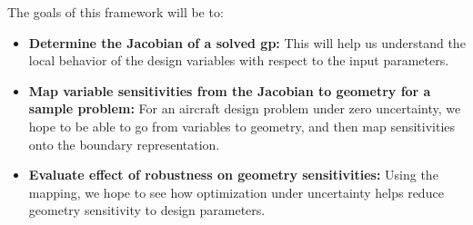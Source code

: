 \documentclass[journal]{new-aiaa}
\begin{document}
The goals of this framework will be to:
\begin{itemize}
    \item \textbf{Determine the Jacobian of a solved \gls{gp}:}
                This will help us understand the local behavior
                of the design variables with respect to the input parameters.
    \item \textbf{Map variable sensitivities from the Jacobian to geometry for a sample problem:}
                For an aircraft design problem under zero uncertainty, we hope to be able to
                go from variables to geometry, and then map sensitivities onto the boundary representation.
    \item \textbf{Evaluate effect of robustness on geometry sensitivities:}
                Using the mapping, we hope to see how optimization under uncertainty
                helps reduce geometry sensitivity to design parameters. 
\end{itemize}



\end{document}
